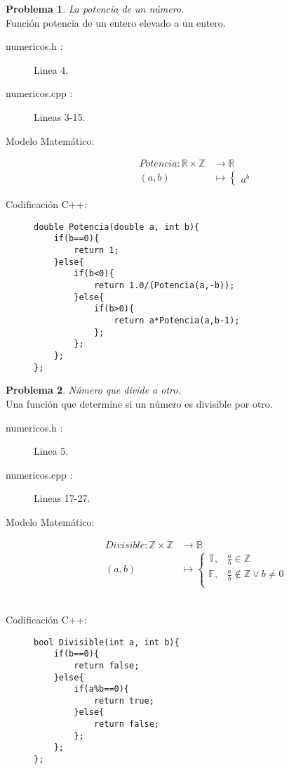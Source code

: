 \documentclass{article}
\theoremstyle{plain}
\theoremstyle{definition}
\newtheorem{problem}{Problema}
\begin{document}
\begin{problem} \emph{La potencia de un número.}\\
\hspace*{7mm}Función potencia de un entero elevado a un entero.
%
\begin{description}
\item[numericos.h :] Linea 4. \item[numericos.cpp :] Lineas 3-15.

\item[Modelo Matemático:]
\begin{align*}
Potencia: \mathbb{R} \times\mathbb{Z}&\to \mathbb{R}\\
(a,b) &\mapsto \begin{cases}
a^{b}
\end{cases}
\end{align*}
%
\item[Codificación \textsf{C++}:]\hfill
%
\begin{verbatim}
double Potencia(double a, int b){
    if(b==0){
        return 1;
    }else{
        if(b<0){
            return 1.0/(Potencia(a,-b));
        }else{
            if(b>0){
                return a*Potencia(a,b-1);
            };
        };
    };
};
\end{verbatim}
\end{description}
\end{problem}

\begin{problem} \emph{Número que divide a otro.}\\
\hspace*{7mm}Una función que determine si un número es divisible por otro.
%
\begin{description}
\item[numericos.h :] Linea 5. \item[numericos.cpp :] Lineas 17-27.

\item[Modelo Matemático:]
\begin{align*}
Divisible: \mathbb{Z} \times\mathbb{Z}&\to \mathbb{B}\\
(a,b) &\mapsto \begin{cases}
\mathbb{T},&\frac{a}{b} \in \mathbb{Z}\\
\mathbb{F},&\frac{a}{b} \not\in \mathbb{Z}\vee b\neq 0\\
\end{cases}
\end{align*}
%
\\
\item[Codificación \textsf{C++}:]\hfill
%
\begin{verbatim}
bool Divisible(int a, int b){
    if(b==0){
        return false;
    }else{
        if(a%b==0){
            return true;
        }else{
            return false;
        };
    };
};
\end{verbatim}
\end{description}
\end{problem}
\end{document}
